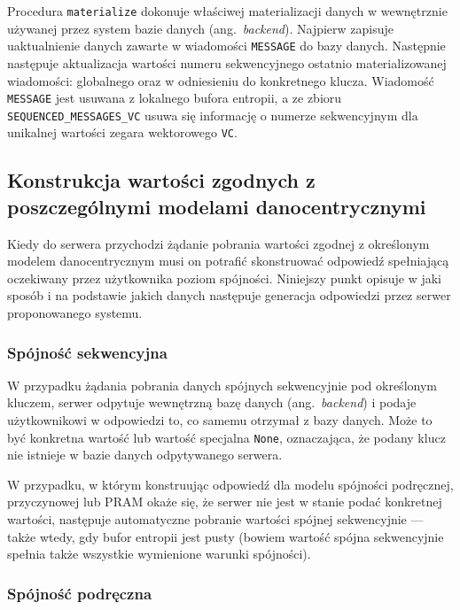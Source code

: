 Procedura \texttt{materialize} dokonuje właściwej materializacji danych w wewnętrznie używanej przez
system bazie danych (ang.\ \textit{backend}). Najpierw zapisuje uaktualnienie danych zawarte w wiadomości \texttt{MESSAGE} do bazy danych. Następnie następuje aktualizacja wartości numeru sekwencyjnego ostatnio materializowanej wiadomości: globalnego oraz w odniesieniu do konkretnego klucza. Wiadomość \texttt{MESSAGE} jest usuwana z lokalnego bufora entropii, a ze zbioru \texttt{SEQUENCED\_MESSAGES\_VC} usuwa się informację o numerze sekwencyjnym dla unikalnej wartości zegara wektorowego \texttt{VC}.

\subsection{Konstrukcja wartości zgodnych z poszczególnymi modelami danocentrycznymi} \label{section:value_construction}

Kiedy do serwera przychodzi żądanie pobrania wartości zgodnej z określonym modelem danocentrycznym musi on potrafić skonstruować odpowiedź spełniającą oczekiwany przez użytkownika poziom spójności. Niniejszy punkt opisuje w jaki sposób i na podstawie jakich danych następuje generacja odpowiedzi przez serwer proponowanego systemu. 

\subsubsection{Spójność sekwencyjna}

W przypadku żądania pobrania danych spójnych sekwencyjnie pod określonym kluczem, serwer odpytuje
wewnętrzną bazę danych (ang.\ \textit{backend}) i podaje użytkownikowi w odpowiedzi to, co samemu otrzymał z bazy danych. Może to być konkretna wartość lub wartość specjalna \texttt{None}, oznaczająca, że podany klucz nie istnieje w bazie danych odpytywanego serwera.

W przypadku, w którym konstruując odpowiedź dla modelu spójności podręcznej, przyczynowej lub PRAM okaże się, że serwer nie jest w stanie podać konkretnej wartości, następuje automatyczne pobranie wartości spójnej sekwencyjnie --- także wtedy, gdy bufor entropii jest pusty (bowiem wartość spójna sekwencyjnie spełnia także wszystkie wymienione warunki spójności).

\subsubsection{Spójność podręczna}

